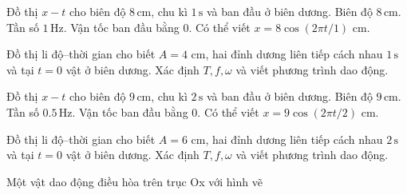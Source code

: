 \begin{ex}
Đồ thị $x-t$ cho biên độ $8\,\text{cm}$, chu kì $1\,\text{s}$ và ban đầu ở biên dương.
\choiceTF
{\True Biên độ $8\,\text{cm}$.}
{\True Tần số $1\,\text{Hz}$.}
{\True Vận tốc ban đầu bằng 0.}
{\True Có thể viết $x=8\cos(2\pi t/1)$ cm.}
\end{ex}

\begin{ex}
Đồ thị li độ–thời gian cho biết $A=4$ cm, hai đỉnh dương liên tiếp cách nhau $1\,\text{s}$ và tại $t=0$ vật ở biên dương. Xác định $T,f,\omega$ và viết phương trình dao động.
\choiceTF

\end{ex}

\begin{ex}
Đồ thị $x-t$ cho biên độ $9\,\text{cm}$, chu kì $2\,\text{s}$ và ban đầu ở biên dương.
\choiceTF
{\True Biên độ $9\,\text{cm}$.}
{\True Tần số $0.5\,\text{Hz}$.}
{\True Vận tốc ban đầu bằng 0.}
{\True Có thể viết $x=9\cos(2\pi t/2)$ cm.}
\end{ex}

\begin{ex}
Đồ thị li độ–thời gian cho biết $A=6$ cm, hai đỉnh dương liên tiếp cách nhau $2\,\text{s}$ và tại $t=0$ vật ở biên dương. Xác định $T,f,\omega$ và viết phương trình dao động.
\choiceTF

\end{ex}

\begin{ex}
Một vật dao động điều hòa trên trục Ox với hình vẽ
\choiceTF

\end{ex}

